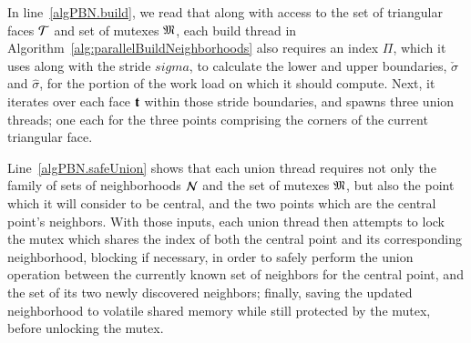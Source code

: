 In line~\ref{algPBN.build}, we read that along with access to the set of triangular faces $\mathcal{T}$ and set of mutexes $\mathfrak{M}$, each build thread in Algorithm~\ref{alg:parallelBuildNeighborhoods} also requires an index $\Pi$, which it uses along with the stride $sigma$, to calculate the lower and upper boundaries, $\check{\sigma}$ and $\hat{\sigma}$, for the portion of the work load on which it should compute. Next, it iterates over each face $\mathbf{t}$ within those stride boundaries, and spawns three union threads; one each for the three points comprising the corners of the current triangular face.

Line~\ref{algPBN.safeUnion} shows that each union thread requires not only the family of sets of neighborhoods $\mathcal{N}$ and the set of mutexes $\mathfrak{M}$, but also the point which it will consider to be central, and the two points which are the central point's neighbors. With those inputs, each union thread then attempts to lock the mutex which shares the index of both the central point and its corresponding neighborhood, blocking if necessary, in order to safely perform the union operation between the currently known set of neighbors for the central point, and the set of its two newly discovered neighbors; finally, saving the updated neighborhood to volatile shared memory while still protected by the mutex, before unlocking the mutex.

